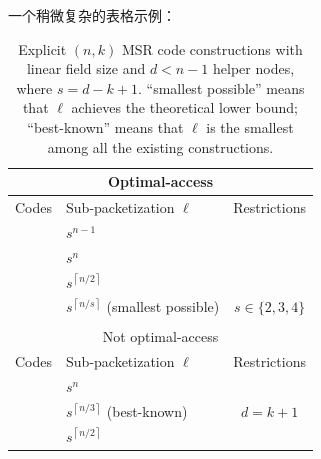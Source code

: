 \documentclass{settings/sdu-thesis}
\begin{document}
一个稍微复杂的表格示例：
\begin{table}[ht]
    \centering
    \renewcommand{\arraystretch}{1}
    \begin{tabular}{|l|l|c|}
        \hline
        \multicolumn{3}{|c|}{Optimal-access}                                                                       \\
        \hline
        \hline
        Codes                      & Sub-packetization $\ell$                                    & Restrictions    \\
        \hline
        \cite[Section VIII]{Ye16}  & $s^{n-1}$                                                   &                 \\
        \hline
        \cite{CB}                  & $s^{n}$                                                     &                 \\
        \hline
        \cite{Liu22}               & $s^{\left\lceil n/2 \right\rceil}$                          &                 \\
        \hline
        \cite{Vajha21}             & $s^{\left\lceil n/s \right\rceil}$      (smallest possible) & $s\in\{2,3,4\}$ \\
        \hline
        \multicolumn{3}{c}{}                                                                                       \\
        \hline
        \multicolumn{3}{|c|}{Not optimal-access}                                                                   \\
        \hline
        \hline
        Codes                      & Sub-packetization $\ell$                                    & Restrictions    \\
        \hline
        \cite[Section IV]{Ye16}    & $s^{n}$                                                     &                 \\
        \hline
        \cite{LWHY22}              & $s^{\left\lceil n/3 \right\rceil}$      (best-known)        & $d=k+1$         \\
        \hline
        \cite{Zhang23} \cite{Li23} & $s^{\left\lceil n/2 \right\rceil}$                          &                 \\
        \hline
    \end{tabular}
    \caption[MSR码的显式构造]{Explicit $(n,k)$ MSR code constructions with linear field size and $d<n-1$ helper nodes, where $s=d-k+1$.
        ``smallest possible'' means that $\ell$ achieves the theoretical lower bound; ``best-known'' means that $\ell$ is the smallest among all the existing constructions.}
    \label{tab:cmp}
\end{table}
\end{document}
